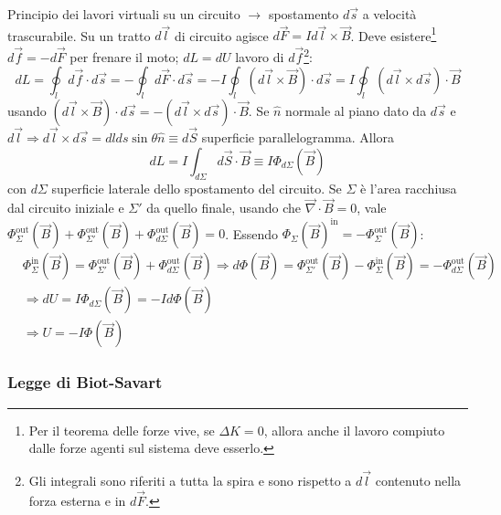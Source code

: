 \documentclass[10pt, a4paper]{scrartcl}
\numberwithin{equation}{subsection}
\theoremstyle{style1}
\begin{document}
Principio dei lavori virtuali su un circuito $\to$ spostamento $d\vec{s}$ a velocit\`a trascurabile. Su un tratto $d\vec{l}$ di circuito agisce $d\vec{F} = Id\vec{l}\times \vec{B}$. Deve esistere\footnote{Per il teorema delle forze vive, se $\Delta K = 0$, allora anche il lavoro compiuto dalle forze agenti sul sistema deve esserlo.} $d\vec{f} = -d\vec{F}$ per frenare il moto; $dL = dU$ lavoro di $d\vec{f}$\footnote{Gli integrali sono riferiti a tutta la spira e sono rispetto a $d\vec{l}$ contenuto nella forza esterna e in $d\vec{F}$.}:
\begin{equation}
	dL = \oint_l d\vec{f}\cdot d\vec{s}  = - \oint_{l} d\vec{F}\cdot d\vec{s} = - I \oint_{l}  (d\vec{l}\times \vec{B}) \cdot d\vec{s} =  I \oint_{l}  (d\vec{l}\times d\vec{s}) \cdot \vec{B}
\end{equation}
usando $(d\vec{l}\times \vec{B}) \cdot d\vec{s} = - (d\vec{l}\times d\vec{s}) \cdot \vec{B}$. Se $\hat{n}$ normale al piano dato da $d\vec{s}$ e $d\vec{l}\Rightarrow d\vec{l}\times d\vec{s} = dl ds \sin \theta  \hat{n}\equiv d\vec{S}$ superficie parallelogramma. Allora 
\begin{equation}
	dL = I \int_{d\Sigma} d\vec{S}\cdot \vec{B} \equiv I \Phi _{d\Sigma}(\vec{B})  
\end{equation}
con $d\Sigma$ superficie laterale dello spostamento del circuito. Se $\Sigma$ \`e l'area racchiusa dal circuito iniziale e $\Sigma'$ da quello finale, usando che $\vec{\nabla }\cdot \vec{B} = 0$, vale $\Phi^\text{out} _\Sigma(\vec{B})+\Phi^\text{out} _{\Sigma'}(\vec{B}) + \Phi^\text{out} _{d\Sigma} (\vec{B}) = 0$. Essendo $\Phi_\Sigma(\vec{B})^\text{in} = - \Phi_{\Sigma}^\text{out} (\vec{B})$:
\begin{equation}
	\begin{split}
		&\Phi^\text{in} _\Sigma(\vec{B})=\Phi^\text{out} _{\Sigma'}(\vec{B}) + \Phi^\text{out} _{d\Sigma} (\vec{B})\Rightarrow d\Phi(\vec{B}) = 	\Phi^\text{out} _{\Sigma'}(\vec{B})-\Phi^\text{in} _\Sigma(\vec{B}) = - \Phi_{d\Sigma}^{\text{out}} (\vec{B}) \\
		&\Rightarrow dU = I\Phi_{d\Sigma}(\vec{B}) = - I d\Phi (\vec{B})\\
		&\Rightarrow U = - I \Phi(\vec{B})
	\end{split}
\end{equation}
\subsubsection{Legge di Biot-Savart}
\end{document}
